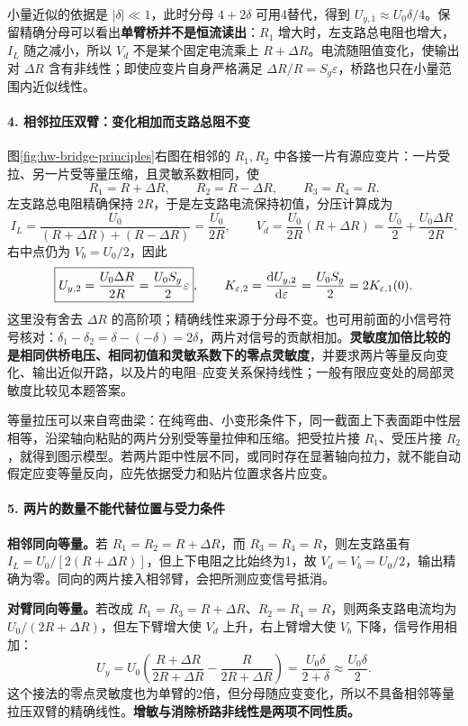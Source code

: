 小量近似的依据是 $|\delta|\ll1$，此时分母 $4+2\delta$ 可用4替代，得到 $U_{y,1}\approx U_0\delta/4$。保留精确分母可以看出\textbf{单臂桥并不是恒流读出}：$R_1$ 增大时，左支路总电阻也增大，$I_L$ 随之减小，所以 $V_d$ 不是某个固定电流乘上 $R+\Delta R$。电流随阻值变化，使输出对 $\Delta R$ 含有非线性；即使应变片自身严格满足 $\Delta R/R=S_g\varepsilon$，桥路也只在小量范围内近似线性。

\paragraph{4. 相邻拉压双臂：变化相加而支路总阻不变}
图\ref{fig:hw-bridge-principles}右图在相邻的 $R_1,R_2$ 中各接一片有源应变片：一片受拉、另一片受等量压缩，且灵敏系数相同，使
\[
R_1=R+\Delta R,\qquad R_2=R-\Delta R,\qquad
R_3=R_4=R.
\]
左支路总电阻精确保持 $2R$，于是左支路电流保持初值，分压计算成为
\[
I_L=\frac{U_0}{(R+\Delta R)+(R-\Delta R)}
=\frac{U_0}{2R},\qquad
V_d=\frac{U_0}{2R}(R+\Delta R)
=\frac{U_0}{2}+\frac{U_0\Delta R}{2R}.
\]
右中点仍为 $V_b=U_0/2$，因此
\[
\boxed{U_{y,2}=\frac{U_0\Delta R}{2R}
=\frac{U_0S_g}{2}\varepsilon},\qquad
K_{\varepsilon,2}=\frac{\mathrm{d} U_{y,2}}{\mathrm{d}\varepsilon}
=\frac{U_0S_g}{2}=2K_{\varepsilon,1}(0).
\]
这里没有舍去 $\Delta R$ 的高阶项；精确线性来源于分母不变。也可用前面的小信号符号核对：$\delta_1-\delta_2=\delta-(-\delta)=2\delta$，两片对信号的贡献相加。\textbf{灵敏度加倍比较的是相同供桥电压、相同初值和灵敏系数下的零点灵敏度}，并要求两片等量反向变化、输出近似开路，以及片的电阻--应变关系保持线性；一般有限应变处的局部灵敏度比较见本题答案。

等量拉压可以来自弯曲梁：在纯弯曲、小变形条件下，同一截面上下表面距中性层相等，沿梁轴向粘贴的两片分别受等量拉伸和压缩。把受拉片接 $R_1$、受压片接 $R_2$，就得到图示模型。若两片距中性层不同，或同时存在显著轴向拉力，就不能自动假定应变等量反向，应先依据受力和贴片位置求各片应变。

\paragraph{5. 两片的数量不能代替位置与受力条件}
\textbf{相邻同向等量。}若 $R_1=R_2=R+\Delta R$，而 $R_3=R_4=R$，则左支路虽有 $I_L=U_0/[2(R+\Delta R)]$，但上下电阻之比始终为1，故 $V_d=V_b=U_0/2$，输出精确为零。同向的两片接入相邻臂，会把所测应变信号抵消。

\textbf{对臂同向等量。}若改成 $R_1=R_3=R+\Delta R$、$R_2=R_4=R$，则两条支路电流均为 $U_0/(2R+\Delta R)$，但左下臂增大使 $V_d$ 上升，右上臂增大使 $V_b$ 下降，信号作用相加：
\[
U_y=U_0\left(\frac{R+\Delta R}{2R+\Delta R}
-\frac{R}{2R+\Delta R}\right)
=\boxed{\frac{U_0\delta}{2+\delta}}
\approx\frac{U_0\delta}{2}.
\]
这个接法的零点灵敏度也为单臂的2倍，但分母随应变变化，所以不具备相邻等量拉压双臂的精确线性。\textbf{增敏与消除桥路非线性是两项不同性质。}

